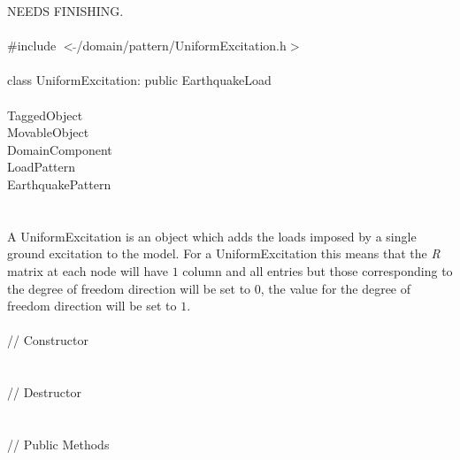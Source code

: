 
NEEDS FINISHING. \\

   \\
\indent \#include $<\tilde{ }$/domain/pattern/UniformExcitation.h$>$  \\

  \\
\indent class UniformExcitation: public EarthquakeLoad  \\

 \\
\indent TaggedObject \\
\indent MovableObject \\
\indent\indent DomainComponent \\
\indent\indent\indent LoadPattern \\
\indent\indent\indent\indent EarthquakePattern \\
\indent\indent\indent{} \\

 \\ 
\indent A UniformExcitation is an object which adds the loads imposed
by a single ground excitation to the model. For a UniformExcitation
this means that the {\em R} matrix at each node will have $1$ column
and all entries but those corresponding to the degree of freedom
direction will be set to $0$, the value for the degree of freedom
direction will be set to $1$.\\

 \\
\indent // Constructor \\ 
\\ \\
\indent // Destructor \\ 
\\  \\
\indent // Public Methods \\ 
 \\ 
\\
\\
\\

